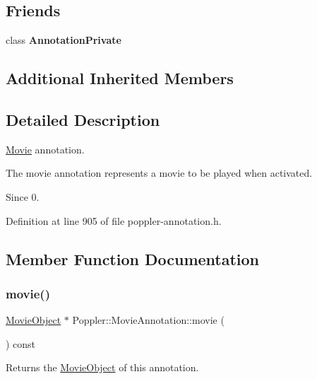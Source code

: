 \subsection*{Friends}
\begin{DoxyCompactItemize}
\item 
\mbox{\label{class_poppler_1_1_movie_annotation_add0bc3e32e560f9e9eb3025587c1ad54}} 
class {\bfseries Annotation\+Private}
\end{DoxyCompactItemize}
\subsection*{Additional Inherited Members}


\subsection{Detailed Description}
\hyperlink{class_movie}{Movie} annotation. 

The movie annotation represents a movie to be played when activated.

\begin{DoxySince}{Since}
0. 
\end{DoxySince}


Definition at line 905 of file poppler-\/annotation.\+h.



\subsection{Member Function Documentation}
\mbox{\label{class_poppler_1_1_movie_annotation_a52809d1fa36ab37fe44f51e55c1c06cf}} 
\subsubsection{\texorpdfstring{movie()}{movie()}}
{\footnotesize\ttfamily \hyperlink{class_poppler_1_1_movie_object}{Movie\+Object} $\ast$ Poppler\+::\+Movie\+Annotation\+::movie (\begin{DoxyParamCaption}{ }\end{DoxyParamCaption}) const}

Returns the \hyperlink{class_poppler_1_1_movie_object}{Movie\+Object} of this annotation. 

